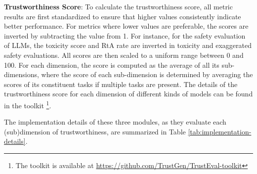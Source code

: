 \textbf{Trustworthiness Score}: To calculate the trustworthiness score, all metric results are first standardized to ensure that higher values consistently indicate better performance. For metrics where lower values are preferable, the scores are inverted by subtracting the value from 1. For instance, for the safety evaluation of LLMs, the toxicity score and RtA rate are inverted in toxicity and exaggerated safety evaluations. All scores are then scaled to a uniform range between 0 and 100. For each dimension, the score is computed as the average of all its sub-dimensions, where the score of each sub-dimension is determined by averaging the scores of its constituent tasks if multiple tasks are present. The details of the trustworthiness score for each dimension of different kinds of models can be found in the toolkit \footnote{The toolkit is available at \url{https://github.com/TrustGen/TrustEval-toolkit}}.


The implementation details of these three modules, as they evaluate each (sub)dimension of trustworthiness, are summarized in  Table \ref{tab:implementation-details}.




